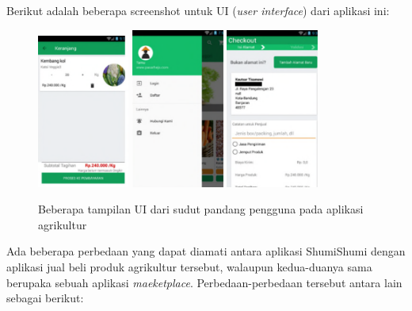 \documentclass[a4paper]{article}
\begin{document}
\begin{enumerate}
    Berikut adalah beberapa screenshot untuk UI (\textit{user interface}) dari aplikasi ini:
    \newpage
    \begin{figure}
        \includegraphics[width=0.27\textwidth]{ui app sejenis/Agrikultur Cart - USER.png}\hfill
        \includegraphics[width=0.27\textwidth]{ui app sejenis/Agrikultur Home Page - USER.png}\hfill
        \includegraphics[width=0.27\textwidth]{ui app sejenis/Agrikultur Transaksi - USER.png}
        \caption{Beberapa tampilan UI dari sudut pandang pengguna pada aplikasi agrikultur}
    \end{figure}

    Ada beberapa perbedaan yang dapat diamati antara aplikasi ShumiShumi dengan aplikasi jual beli produk agrikultur tersebut, walaupun kedua-duanya sama berupaka sebuah aplikasi \textit{maeketplace}. Perbedaan-perbedaan tersebut antara lain sebagai berikut:


\end{enumerate}
\end{document}
